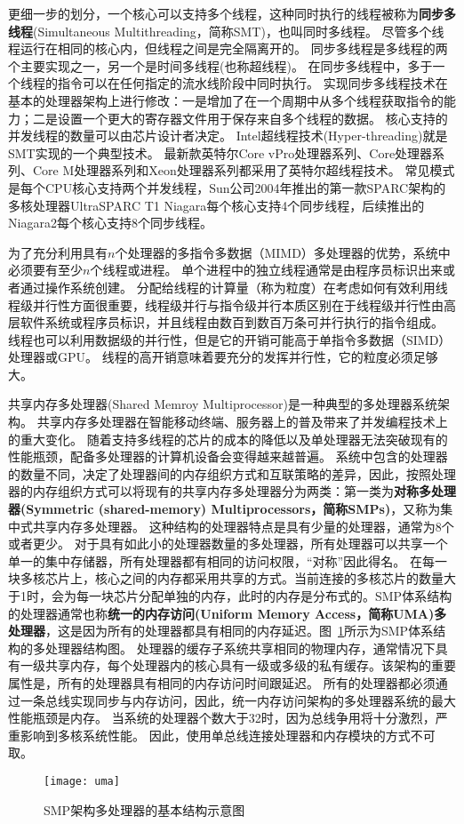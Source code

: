 更细一步的划分，一个核心可以支持多个线程，这种同时执行的线程被称为\textbf{同步多线程}(Simultaneous Multithreading，简称SMT)，也叫同时多线程。
尽管多个线程运行在相同的核心内，但线程之间是完全隔离开的。
同步多线程是多线程的两个主要实现之一，另一个是时间多线程(也称超线程)。
在同步多线程中，多于一个线程的指令可以在任何指定的流水线阶段中同时执行。
实现同步多线程技术在基本的处理器架构上进行修改：一是增加了在一个周期中从多个线程获取指令的能力；二是设置一个更大的寄存器文件用于保存来自多个线程的数据。
核心支持的并发线程的数量可以由芯片设计者决定。
Intel超线程技术(Hyper-threading)就是SMT实现的一个典型技术\cite{marr2002hyper}。
最新款英特尔Core vPro处理器系列\cite{samson2005interface}、Core处理器系列\cite{lempel20112nd}、Core M处理器系列和Xeon处理器系列\cite{chang200765}都采用了英特尔超线程技术。
常见模式是每个CPU核心支持两个并发线程，Sun公司2004年推出的第一款SPARC架构的多核处理器UltraSPARC T1 Niagara每个核心支持4个同步线程\cite{kongetira2005niagara}，后续推出的Niagara2每个核心支持8个同步线程。

为了充分利用具有$n$个处理器的多指令多数据（MIMD）多处理器的优势，系统中必须要有至少$n$个线程或进程。
单个进程中的独立线程通常是由程序员标识出来或者通过操作系统创建。
分配给线程的计算量（称为粒度）在考虑如何有效利用线程级并行性方面很重要，线程级并行与指令级并行本质区别在于线程级并行性由高层软件系统或程序员标识，并且线程由数百到数百万条可并行执行的指令组成。
线程也可以利用数据级的并行性，但是它的开销可能高于单指令多数据（SIMD）处理器或GPU\cite{shi2012vcuda}。
线程的高开销意味着要充分的发挥并行性，它的粒度必须足够大。

共享内存多处理器(Shared Memroy Multiprocessor)是一种典型的多处理器系统架构。
共享内存多处理器在智能移动终端、服务器上的普及带来了并发编程技术上的重大变化。
随着支持多线程的芯片的成本的降低以及单处理器无法突破现有的性能瓶颈，配备多处理器的计算机设备会变得越来越普遍。
系统中包含的处理器的数量不同，决定了处理器间的内存组织方式和互联策略的差异，因此，按照处理器的内存组织方式可以将现有的共享内存多处理器分为两类：第一类为\textbf{对称多处理器(Symmetric (shared-memory) Multiprocessors，简称SMPs)}，又称为集中式共享内存多处理器。
	这种结构的处理器特点是具有少量的处理器，通常为8个或者更少。
	对于具有如此小的处理器数量的多处理器，所有处理器可以共享一个单一的集中存储器，所有处理器都有相同的访问权限，“对称”因此得名。
	在每一块多核芯片上，核心之间的内存都采用共享的方式。当前连接的多核芯片的数量大于1时，会为每一块芯片分配单独的内存，此时的内存是分布式的。SMP体系结构的处理器通常也称\textbf{统一的内存访问(Uniform Memory Access，简称UMA)多处理器}，这是因为所有的处理器都具有相同的内存延迟。图~\ref{fig:uma}所示为SMP体系结构的多处理器结构图。
	处理器的缓存子系统共享相同的物理内存，通常情况下具有一级共享内存，每个处理器内的核心具有一级或多级的私有缓存。该架构的重要属性是，所有的处理器具有相同的内存访问时间跟延迟。
	所有的处理器都必须通过一条总线实现同步与内存访问，因此，统一内存访问架构的多处理器系统的最大性能瓶颈是内存。
	当系统的处理器个数大于32时，因为总线争用将十分激烈，严重影响到多核系统性能。
	因此，使用单总线连接处理器和内存模块的方式不可取。
\begin{figure}
\centering
\texttt{[image: uma]}
\caption{SMP架构多处理器的基本结构示意图}
\label{fig:uma}
\end{figure}
	

